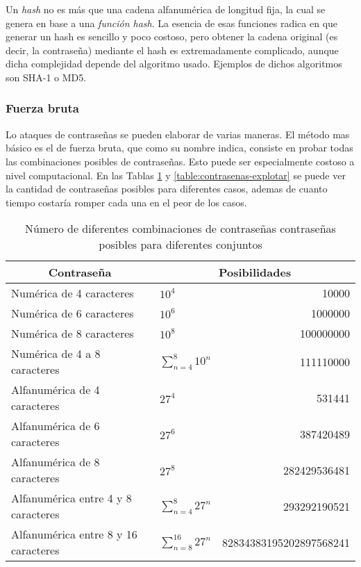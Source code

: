 Un \emph{hash} no es más que una cadena alfanumérica de longitud fija, la cual se genera en base a una \emph{función hash}. La esencia de esas funciones radica en que generar un hash es sencillo y poco costoso, pero obtener la cadena original (es decir, la contraseña) mediante el hash es extremadamente complicado, aunque dicha complejidad depende del algoritmo usado. Ejemplos de dichos algoritmos son SHA-1 o MD5.

\subsubsection{Fuerza bruta}

Lo ataques de contraseñas se pueden elaborar de varias maneras. El método mas básico es el de fuerza bruta, que como su nombre indica, consiste en probar todas las combinaciones posibles de contraseñas. Esto puede ser especialmente costoso a nivel computacional. En las Tablas \ref{table:contrasenas} y \ref{table:contrasenas-explotar} se puede ver la cantidad de contraseñas posibles para diferentes casos, ademas de cuanto tiempo costaría romper cada una en el peor de los casos.

\begin{table}[H]
	\centering
	\begin{tabular}{ |l|l|r| } 
		\hline
		\multicolumn{1}{|c|}{Contraseña} & 
		\multicolumn{2}{|c|}{Posibilidades} \\
		\hline
		Numérica de 4 caracteres 				& $ 10^4 $						& 10000 					\\
		Numérica de 6 caracteres 				& $ 10^6 $ 						& 1000000				 	\\
		Numérica de 8 caracteres 				& $ 10^8 $ 						& 100000000 			 	\\
		Numérica de 4 a 8 caracteres 			& $ \sum_{n=4}^{8} 10^{n} $ 	& 111110000 				\\
		\hline
		Alfanumérica de 4 caracteres 			& $ 27^4  $ 					& 531441  				 	\\
		Alfanumérica de 6 caracteres 			& $ 27^6 $ 						& 387420489  				\\
		Alfanumérica de 8 caracteres			& $ 27^8 $ 						& 282429536481 			 	\\
		Alfanumérica entre 4 y 8 caracteres		& $ \sum_{n=4}^{8} 27^{n} $		& 293292190521 				\\
		Alfanumérica entre 8 y 16 caracteres 	& $ \sum_{n=8}^{16} 27^{n} $	& 82834383195202897568241	\\
		\hline
	\end{tabular}
	\caption{Número de diferentes combinaciones de contraseñas contraseñas posibles para diferentes conjuntos}
	\label{table:contrasenas}
\end{table}

